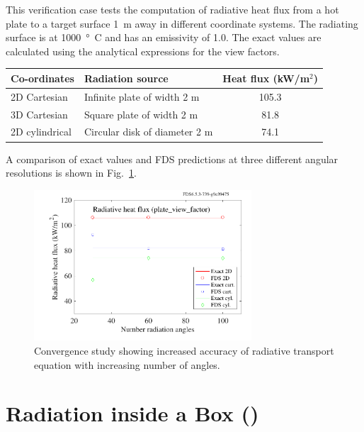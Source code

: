 \documentclass[11pt]{book}
\begin{document}
This verification case tests the computation of radiative heat flux from a hot plate to a target surface 1~m away in different coordinate systems. The radiating surface is at 1000~\si{\degree C} and has an emissivity of 1.0.  The exact values are calculated using the analytical expressions for the view factors.
\begin{center}
\begin{tabular}{|l|l|c|}
\hline Co-ordinates & Radiation source & Heat flux (kW/m$^2$)  \\ \hline \hline
2D Cartesian   & Infinite plate of width 2 m   & 105.3 \\
3D Cartesian   & Square plate of width 2 m     & 81.8 \\
2D cylindrical & Circular disk of diameter 2 m & 74.1 \\ \hline
\end{tabular}
\end{center}
A comparison of exact values and FDS predictions at three different angular resolutions is shown in Fig.~\ref{fig_plate_view_factor}.
\begin{figure}[ht]
\centering
\includegraphics[width=3.2in]{SCRIPT_FIGURES/plate_view_factor}
\caption[The {\ct plate\_view\_factor} test case]{Convergence study showing increased accuracy of radiative transport equation with increasing number of angles.}
\label{fig_plate_view_factor}
\end{figure}



\section{Radiation inside a Box (\texorpdfstring{}{radiation\_in\_a\_box}) }
\label{radiation_in_a_box}
\label{radiation_box}
\end{document}
